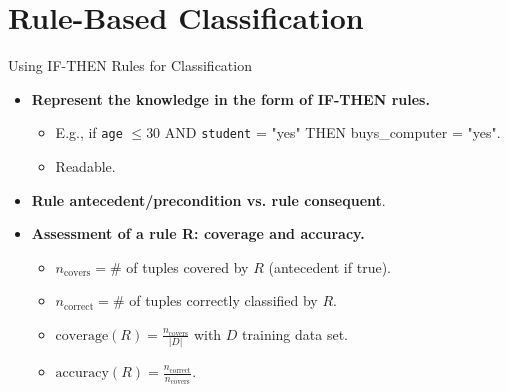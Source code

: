 \section{Rule-Based Classification}

\begin{frame}{Using \uppercase{if-then} Rules for Classification}
	\begin{itemize}
		\item \textbf{Represent the knowledge in the form of {\color{airforceblue}IF-THEN rules}.}
		      \begin{itemize}
			      \item E.g., if \texttt{age} $\leq 30$ AND \texttt{student} = "yes" THEN buys\_computer = "yes".
			      \item Readable.
		      \end{itemize}
		\item \textbf{Rule {\color{airforceblue}antecedent/precondition} vs. rule {\color{airforceblue}consequent}}.
		\item \textbf{Assessment of a rule R: coverage and accuracy.}
		      \begin{itemize}
			      \item $n_{\text{covers}} = \#$ of tuples covered by $R$ (antecedent if true).
			      \item $n_{\text{correct}} = \#$ of tuples correctly classified by $R$.
			      \item $\text{coverage}(R) = \frac{n_{\text{covers}}}{|D|}$ with $D$ training data set.
			      \item $\text{accuracy}(R) = \frac{n_{\text{correct}}}{n_{\text{covers}}}$.
		      \end{itemize}
	\end{itemize}
\end{frame}

